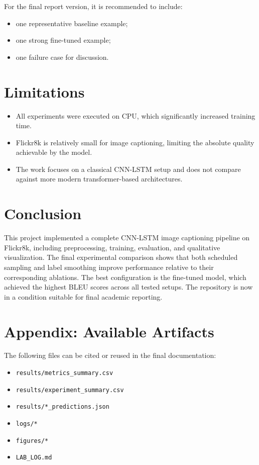 \documentclass[11pt,a4paper]{article}
\begin{document}
For the final report version, it is recommended to include:
\begin{itemize}[leftmargin=*]
    \item one representative baseline example;
    \item one strong fine-tuned example;
    \item one failure case for discussion.
\end{itemize}

\section{Limitations}

\begin{itemize}[leftmargin=*]
    \item All experiments were executed on CPU, which significantly increased training time.
    \item Flickr8k is relatively small for image captioning, limiting the absolute quality achievable by the model.
    \item The work focuses on a classical CNN-LSTM setup and does not compare against more modern transformer-based architectures.
\end{itemize}

\section{Conclusion}

This project implemented a complete CNN-LSTM image captioning pipeline on Flickr8k, including preprocessing, training, evaluation, and qualitative visualization. The final experimental comparison shows that both scheduled sampling and label smoothing improve performance relative to their corresponding ablations. The best configuration is the fine-tuned model, which achieved the highest BLEU scores across all tested setups. The repository is now in a condition suitable for final academic reporting.

\section*{Appendix: Available Artifacts}

The following files can be cited or reused in the final documentation:
\begin{itemize}[leftmargin=*]
    \item \texttt{results/metrics\_summary.csv}
    \item \texttt{results/experiment\_summary.csv}
    \item \texttt{results/*\_predictions.json}
    \item \texttt{logs/*}
    \item \texttt{figures/*}
    \item \texttt{LAB\_LOG.md}
\end{itemize}
\end{document}

